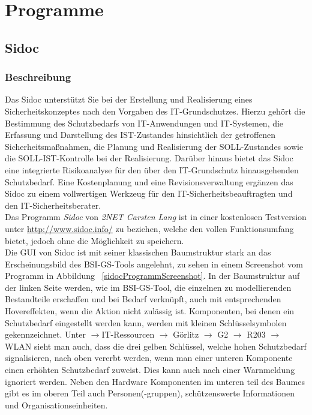 \section{Programme}
\subsection{Sidoc}
\subsubsection{Beschreibung}
Das Sidoc unterstützt Sie bei der Erstellung und Realisierung eines Sicherheitskonzeptes nach den Vorgaben des IT-Grundschutzes. Hierzu gehört die Bestimmung des Schutzbedarfs von IT-Anwendungen und IT-Systemen, die Erfassung und Darstellung des IST-Zustandes hinsichtlich der getroffenen Sicherheitsmaßnahmen, die Planung und Realisierung der SOLL-Zustandes sowie die SOLL-IST-Kontrolle bei der Realisierung. Darüber hinaus bietet das Sidoc eine integrierte Risikoanalyse für den über den IT-Grundschutz hinausgehenden Schutzbedarf.
Eine Kostenplanung und eine Revisionsverwaltung ergänzen das Sidoc zu einem vollwertigen Werkzeug für den IT-Sicherheitsbeauftragten und den IT-Sicherheitsberater.\cite{sidocDoku}
\\
Das Programm \textit{Sidoc} von \textit{2NET Carsten Lang} ist in einer kostenlosen Testversion unter \url{http://www.sidoc.info/} zu beziehen, welche den vollen Funktionsumfang bietet, jedoch ohne die Möglichkeit zu speichern.
\\
Die GUI von Sidoc ist mit seiner klassischen Baumstruktur stark an das Erscheinungsbild des BSI-GS-Tools angelehnt, zu sehen in einem Screenshot vom Programm in Abbildung ~\ref{sidocProgrammScreenshot}. In der Baumstruktur auf der linken Seite werden, wie im BSI-GS-Tool, die einzelnen zu modellierenden Bestandteile erschaffen und bei Bedarf verknüpft, auch mit entsprechenden Hovereffekten, wenn die Aktion nicht zulässig ist.
Komponenten, bei denen ein Schutzbedarf eingestellt werden kann, werden mit kleinen Schlüsselsymbolen gekennzeichnet. Unter $\rightarrow$IT-Ressourcen $\rightarrow$ Görlitz $\rightarrow$ G2 $\rightarrow$ R203 $\rightarrow$ WLAN sieht man auch, dass die drei gelben Schlüssel, welche hohen Schutzbedarf signalisieren, nach oben vererbt werden, wenn man einer unteren Komponente einen erhöhten Schutzbedarf zuweist. Dies kann auch nach einer Warnmeldung ignoriert werden.
Neben den Hardware Komponenten im unteren teil des Baumes gibt es im oberen Teil auch Personen(-gruppen), schützenswerte Informationen und Organisationseinheiten.
